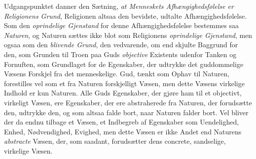 Udgangspunktet danner den Sætning, \emph{at Menneskets Afhængighedsfølelse er
Religionens Grund}, Religionen altsaa den bevidste, udtalte
Afhængighedsfølelse. Som den \emph{oprindelige Gjenstand} for denne
Afhængighedsfølelse bestemmes saa \emph{Naturen}, og Naturen sættes ikke blot som
Religionens \emph{oprindelige Gjenstand}, men ogsaa som den \emph{blivende Grund},
den vedvarende, om end skjulte Baggrund for den, som Grunden til Troen paa Guds
\emph{objective} Existents udenfor Tanken og Fornuften, som Grundlaget for de
Egenskaber, der udtrykke det guddommelige Væsens Forskjel fra det menneskelige.
Gud, tænkt som Ophav til Naturen, forestilles vel som et fra Naturen
forskjelligt Væsen, men dette Væsens virkelige Indhold er kun Naturen. Alle
Guds Egenskaber, der gjøre ham til et objectivt, virkeligt Væsen, ere
Egenskaber, der ere abstraherede fra Naturen, der forudsætte den, udtrykke den,
og som altsaa falde bort, naar Naturen falder bort. Vel bliver der da endnu
tilbage et Væsen, et Indbegreb af Egenskaber som Uendelighed, Enhed,
Nødvendighed, Evighed, men dette Væsen er ikke Andet end Naturens
\emph{abstracte} Væsen, der, som saadant, forudsætter dens concrete, sandselige,
virkelige Væsen.

